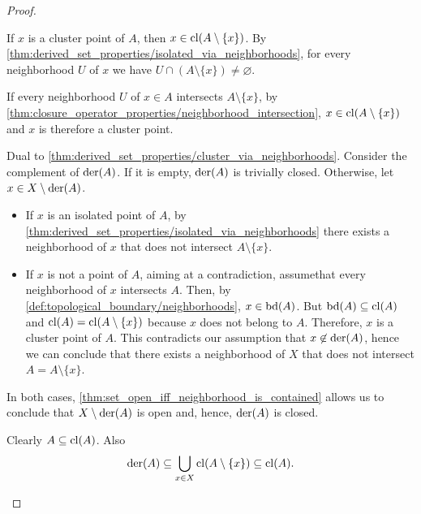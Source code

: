 \begin{proof}
  \begin{description}
    \mbox{}
    \begin{description}
      \Implies If \( x \) is a cluster point of \( A \), then \( x \in \operatorname{cl}(A \setminus \{ x \}) \). By \cref{thm:derived_set_properties/isolated_via_neighborhoods}, for every neighborhood \( U \) of \( x \) we have \( U \cap (A \setminus \{ x \}) \neq \varnothing \).

      \ImpliedBy If every neighborhood \( U \) of \( x \in A \) intersects \( A \setminus \{ x \} \), by \cref{thm:closure_operator_properties/neighborhood_intersection}, \( x \in \operatorname{cl}(A \setminus \{ x \}) \) and \( x \) is therefore a cluster point.
    \end{description}

     Dual to \cref{thm:derived_set_properties/cluster_via_neighborhoods}.
     Consider the complement of \( \operatorname{der}(A) \). If it is empty, \( \operatorname{der}(A) \) is trivially closed. Otherwise, let \( x \in X \setminus \operatorname{der}(A) \).

    \begin{itemize}
      \item If \( x \) is an isolated point of \( A \), by \cref{thm:derived_set_properties/isolated_via_neighborhoods} there exists a neighborhood of \( x \) that does not intersect \( A \setminus \{ x \} \).
      \item If \( x \) is not a point of \( A \), aiming at a contradiction, assume\LEM that every neighborhood of \( x \) intersects \( A \). Then, by \cref{def:topological_boundary/neighborhoods}, \( x \in \operatorname{bd}(A) \). But \( \operatorname{bd}(A) \subseteq \operatorname{cl}(A) \) and \( \operatorname{cl}(A) = \operatorname{cl}(A \setminus \{ x \}) \) because \( x \) does not belong to \( A \). Therefore, \( x \) is a cluster point of \( A \). This contradicts our assumption that \( x \not\in \operatorname{der}(A) \), hence we can conclude that there exists a neighborhood of \( X \) that does not intersect \( A = A \setminus \{ x \} \).
    \end{itemize}

    In both cases, \cref{thm:set_open_iff_neighborhood_is_contained} allows us to conclude that \( X \setminus \operatorname{der}(A) \) is open and, hence, \( \operatorname{der}(A) \) is closed.

     Clearly \( A \subseteq \operatorname{cl}(A) \). Also
    \begin{equation*}
      \operatorname{der}(A) \subseteq \bigcup_{x \in X} \operatorname{cl}(A \setminus \{ x \}) \subseteq \operatorname{cl}(A).
    \end{equation*}


\end{description}
\end{proof}
